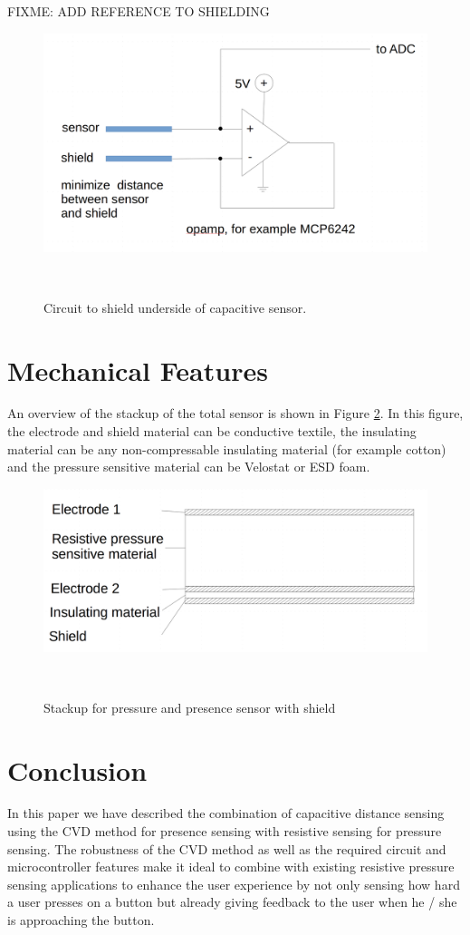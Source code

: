 \documentclass{sigchi-ext}
\begin{document}
FIXME: ADD REFERENCE TO SHIELDING

\begin{figure}[!htbp]
\centering
  \includegraphics[width=0.9\columnwidth]{figures/shield_circuit}
  \caption{Circuit to shield underside of capacitive
sensor.}~\label{fig:shield_circuit}
\end{figure}

\section{Mechanical Features}
An overview of the stackup of the total sensor is shown in Figure
\ref{fig:stackup}. In this figure, the electrode and shield material can be
conductive textile, the insulating material can be any non-compressable
insulating material (for example cotton) and the pressure sensitive material can
be Velostat or ESD foam.

\begin{figure}[!htbp]
\centering
  \includegraphics[width=0.9\columnwidth]{figures/stackup}
  \caption{Stackup for pressure and presence sensor with
shield}~\label{fig:stackup}
\end{figure}


\section{Conclusion}
In this paper we have described the combination of capacitive distance sensing
using the CVD method for presence sensing with resistive sensing for pressure
sensing. The robustness of the CVD method as well as the required circuit and
microcontroller features make it ideal to combine with existing resistive
pressure sensing applications to enhance the user experience by not only sensing
how hard a user presses on a button but already giving feedback to the user when
he / she is approaching the button.
\balance{} 


\end{document}
